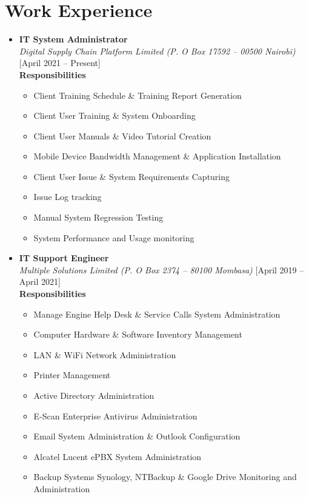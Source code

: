 \documentclass[11pt,a4paper]{moderncv}
\begin{document}
\section{Work Experience}

\begin{itemize}
	
	\item \textbf{IT System Administrator}\\
	\textit{Digital Supply Chain Platform Limited (P. O Box 17592 { -- } 00500 Nairobi)} \hfill [April 2021 { -- } Present]\\
	\textbf{Responsibilities}
	\begin{itemize}
		\item Client Training Schedule \& Training Report Generation
		\item Client User Training \& System Onboarding
		\item Client User Manuals \& Video Tutorial Creation
		\item Mobile Device Bandwidth Management \& Application Installation
		\item Client User Issue \& System Requirements Capturing
		\item Issue Log tracking 
		\item Manual System Regression Testing
		\item System Performance and Usage monitoring

	\end{itemize}
	
\end{itemize}

\begin{itemize}
	
	\item \textbf{IT Support Engineer}\\
	\textit{Multiple Solutions Limited (P. O Box 2374 { -- } 80100 Mombasa)} \hfill [April 2019 { -- } April 2021]\\
	\textbf{Responsibilities}
	\begin{itemize}
		\item Manage Engine Help Desk \& Service Calls System Administration
		\item Computer Hardware \& Software Inventory Management
		\item LAN \& WiFi Network Administration 
		\item Printer Management
		\item Active Directory Administration
		\item E-Scan Enterprise Antivirus Administration
		\item Email System Administration \& Outlook Configuration
		\item Alcatel Lucent ePBX System Administration 
		\item Backup Systems Synology, NTBackup \& Google Drive Monitoring and Administration 
	\end{itemize}
	
\end{itemize}
\end{document}
